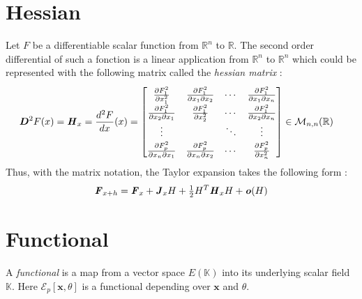 \section{Hessian}
Let $F$ be a differentiable scalar function from $\mathbb{R}^n$ to $\mathbb{R}$. The second order differential of such a fonction is a linear application from $\mathbb{R}^n$ to $\mathbb{R}^n$ which could be represented with the following matrix called the \emph{hessian matrix} :
\begin{equation}
\renewcommand\arraystretch{1.5}
\begin{aligned}
	&\boldsymbol{D}^{2}F(x) = \mat{H}_{x} = \frac{d^2F}{dx}(x) =
	\begin{bmatrix}
		\frac{\partial F^2_1}{\partial x_1^2} & \frac{\partial F^2_1}{\partial x_1\partial x_2} &\cdots & \frac{\partial F^2_1}{\partial x_1\partial x_n} \\
		\frac{\partial F^2_1}{\partial x_2\partial x_1} & \frac{\partial F^2_1}{\partial x_2^2} &\cdots & \frac{\partial F^2_1}{\partial x_2\partial x_n} \\
		\vdots & &\ddots & \vdots \\
		\frac{\partial F^2_p}{\partial x_n\partial x_1} & \frac{\partial F^2_p}{\partial x_n\partial x_2}&\cdots & \frac{\partial F^2_p}{\partial x_n^2}
	\end{bmatrix}
	\in\mathcal{M}_{n,n}(\mathbb{R})
\end{aligned}
\end{equation}
Thus, with the matrix notation, the Taylor expansion takes the following form :
\begin{align}
	\boldsymbol{\mathit{F}}_{x+h} = \boldsymbol{\mathit{F}}_{x} +  \boldsymbol{\mathit{J}}_{x} H + \tfrac{1}{2}H^T \boldsymbol{\mathit{H}}_{x} H + \boldsymbol{\mathit{o}}(H)
\end{align}


\section{Functional}
A \emph{functional} is a map from a vector space $E(\mathbb{K})$ into its underlying scalar field $\mathbb{K}$. Here $\mathcal{E}_p[\boldsymbol{x},\theta]$ is a functional depending over $\boldsymbol{x}$ and $\theta$.






